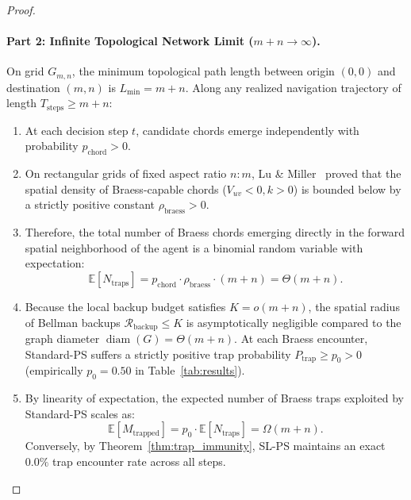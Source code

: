 \documentclass[11pt,a4paper]{article}
\begin{document}
\begin{proof}
\paragraph{Part 2: Infinite Topological Network Limit ($m + n \to \infty$).}
On grid $G_{m,n}$, the minimum topological path length between origin $(0, 0)$ and destination $(m, n)$ is $L_{\min} = m + n$. Along any realized navigation trajectory of length $T_{\text{steps}} \ge m + n$:
\begin{enumerate}
    \item At each decision step $t$, candidate chords emerge independently with probability $p_{\text{chord}} > 0$.
    \item On rectangular grids of fixed aspect ratio $n : m$, Lu \& Miller~\cite{lu2026braess} proved that the spatial density of Braess-capable chords ($V_{uv} < 0, k > 0$) is bounded below by a strictly positive constant $\rho_{\text{braess}} > 0$.
    \item Therefore, the total number of Braess chords emerging directly in the forward spatial neighborhood of the agent is a binomial random variable with expectation:
    \begin{equation}
    \mathbb{E}[N_{\text{traps}}] = p_{\text{chord}} \cdot \rho_{\text{braess}} \cdot (m + n) = \Theta(m + n).
    \end{equation}
    \item Because the local backup budget satisfies $K = o(m+n)$, the spatial radius of Bellman backups $\mathcal{R}_{\text{backup}} \le K$ is asymptotically negligible compared to the graph diameter $\operatorname{diam}(G) = \Theta(m+n)$. At each Braess encounter, Standard-PS suffers a strictly positive trap probability $P_{\text{trap}} \ge p_0 > 0$ (empirically $p_0 = 0.50$ in Table~\ref{tab:results}).
    \item By linearity of expectation, the expected number of Braess traps exploited by Standard-PS scales as:
    \begin{equation}
    \mathbb{E}[M_{\text{trapped}}] = p_0 \cdot \mathbb{E}[N_{\text{traps}}] = \Omega(m + n).
    \end{equation}
    Conversely, by Theorem~\ref{thm:trap_immunity}, SL-PS maintains an exact $0.0\%$ trap encounter rate across all steps.
\end{enumerate}


\end{proof}
\end{document}
